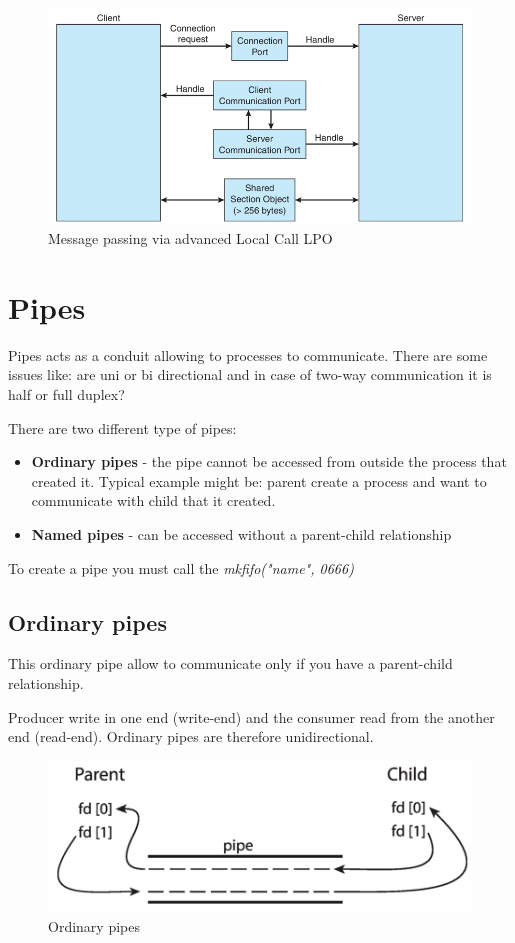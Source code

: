 \begin{figure}[htbp]
    \centering
    \includegraphics[width=0.65\linewidth]{img/LPC.png}
    \caption{Message passing via advanced Local Call LPO}
    
\end{figure}

\newpage
\section{Pipes}
Pipes acts as a conduit allowing to processes to communicate. There are some issues like: are uni or bi directional and in case of two-way communication it is half or full duplex?

There are two different type of pipes:

\begin{itemize}
    \item \textbf{Ordinary pipes} - the pipe cannot be accessed from outside the process that created it. Typical example might be: parent create a process and want to communicate with child that it created.
    \item \textbf{Named pipes} - can be accessed without a parent-child relationship
\end{itemize}

To create a pipe you must call the \textit{mkfifo("name", 0666)}

\subsection{Ordinary pipes}
This ordinary pipe allow to communicate only if you have a parent-child relationship.

Producer write in one end (write-end) and the consumer read from the another end (read-end). Ordinary pipes are therefore unidirectional.

\begin{figure}[htbp]
    \centering
    \includegraphics[width=0.55\linewidth]{img/O_Pipes.png}
    \caption{Ordinary pipes}    
\end{figure}


